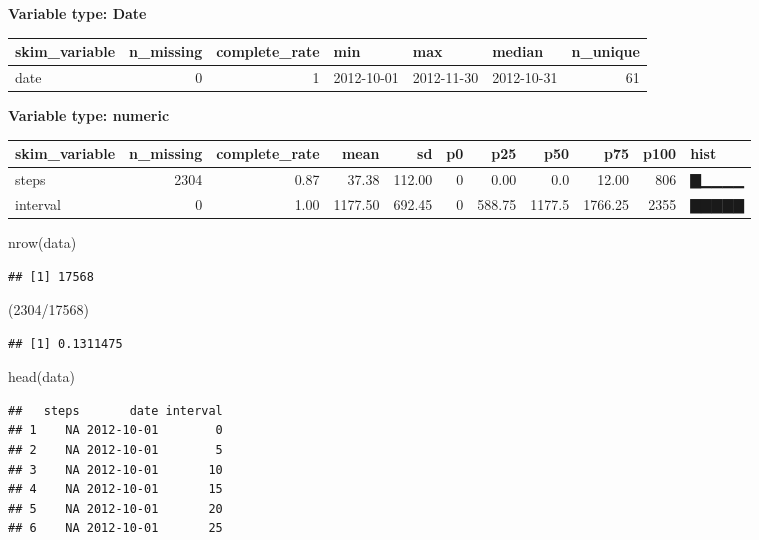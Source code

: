 \documentclass[
]{article}
\newenvironment{Shaded}{\begin{snugshade}}{\end{snugshade}}
\newcommand{\DecValTok}[1]{\textcolor[rgb]{0.00,0.00,0.81}{#1}}
\newcommand{\FunctionTok}[1]{\textcolor[rgb]{0.00,0.00,0.00}{#1}}
\newcommand{\NormalTok}[1]{#1}
\newcommand{\SpecialCharTok}[1]{\textcolor[rgb]{0.00,0.00,0.00}{#1}}
\begin{document}
\textbf{Variable type: Date}

\begin{longtable}[]{@{}lrrlllr@{}}
\toprule
skim\_variable & n\_missing & complete\_rate & min & max & median &
n\_unique \\
\midrule
\endhead
date & 0 & 1 & 2012-10-01 & 2012-11-30 & 2012-10-31 & 61 \\
\bottomrule
\end{longtable}

\textbf{Variable type: numeric}

\begin{longtable}[]{@{}lrrrrrrrrrl@{}}
\toprule
skim\_variable & n\_missing & complete\_rate & mean & sd & p0 & p25 &
p50 & p75 & p100 & hist \\
\midrule
\endhead
steps & 2304 & 0.87 & 37.38 & 112.00 & 0 & 0.00 & 0.0 & 12.00 & 806 &
▇▁▁▁▁ \\
interval & 0 & 1.00 & 1177.50 & 692.45 & 0 & 588.75 & 1177.5 & 1766.25 &
2355 & ▇▇▇▇▇ \\
\bottomrule
\end{longtable}

\begin{Shaded}
\begin{Highlighting}[]
\FunctionTok{nrow}\NormalTok{(data)}
\end{Highlighting}
\end{Shaded}

\begin{verbatim}
## [1] 17568
\end{verbatim}

\begin{Shaded}
\begin{Highlighting}[]
\NormalTok{(}\DecValTok{2304}\SpecialCharTok{/}\DecValTok{17568}\NormalTok{)}
\end{Highlighting}
\end{Shaded}

\begin{verbatim}
## [1] 0.1311475
\end{verbatim}

\begin{Shaded}
\begin{Highlighting}[]
\FunctionTok{head}\NormalTok{(data)}
\end{Highlighting}
\end{Shaded}

\begin{verbatim}
##   steps       date interval
## 1    NA 2012-10-01        0
## 2    NA 2012-10-01        5
## 3    NA 2012-10-01       10
## 4    NA 2012-10-01       15
## 5    NA 2012-10-01       20
## 6    NA 2012-10-01       25
\end{verbatim}
\end{document}
